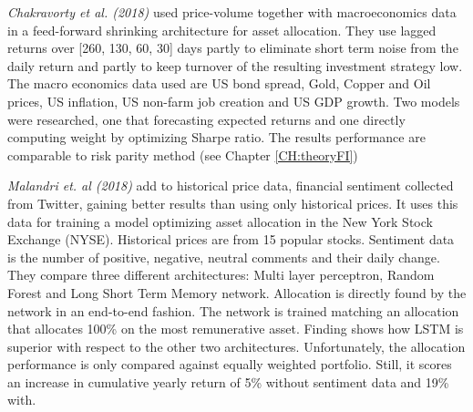 \hfill \break

\textit{Chakravorty et al. (2018)} \cite{chakravorty2018deep} used price-volume  together with macroeconomics data in a feed-forward shrinking architecture for asset allocation. They use lagged returns over [260, 130, 60, 30] days partly to eliminate short term noise from the daily return and partly to keep turnover of the resulting investment strategy low.
The macro economics data used are US bond spread, Gold, Copper and Oil prices, US inflation, US non-farm job creation and US GDP growth. Two models were researched, one that forecasting expected returns and one directly computing weight by optimizing Sharpe ratio. 
The results performance are comparable to risk parity method (see Chapter \ref{CH:theoryFI})

\hfill \break

\textit{Malandri et. al (2018)} \cite{malandri2018public} add to historical price data, financial sentiment collected from Twitter, gaining better results than using only historical prices. It uses this data for training a model optimizing asset allocation in the New York Stock Exchange (NYSE). Historical prices are from 15 popular stocks. Sentiment data is the number of positive, negative, neutral comments and their daily change. They compare three different architectures: Multi layer perceptron, Random Forest and Long Short Term Memory network. Allocation is directly found by the network in an end-to-end fashion. The network is trained matching an allocation that allocates 100\% on the most remunerative asset. Finding shows how LSTM is superior with respect to the other two architectures. Unfortunately, the allocation performance is only compared against equally weighted portfolio. Still, it scores an increase in cumulative yearly return of 5\% without sentiment data and 19\% with.











